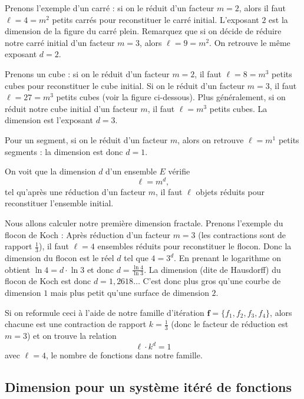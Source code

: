 \documentclass[11pt,class=report,crop=false]{standalone}
\begin{document}
Prenons l'exemple d'un carré : si on le réduit d'un facteur $m=2$,
alors il faut $\ell=4=m^2$ petits carrés pour reconstituer le carré initial.
L'exposant $2$ est la dimension de la figure du carré plein. Remarquez que si
on décide de réduire notre carré initial d'un facteur $m=3$,
alors $\ell=9=m^2$. On retrouve le même exposant $d=2$.


Prenons un cube : si on le réduit d'un facteur $m=2$, il faut 
$\ell=8=m^3$ petits cubes pour reconstituer le cube initial.
Si on le réduit d'un facteur $m=3$, il faut 
$\ell=27=m^3$ petits cubes (voir la figure ci-dessous).
Plus généralement, si on réduit notre cube initial d'un facteur $m$, il faut
$\ell=m^3$ petits cubes. La dimension est l'exposant $d=3$.


Pour un segment, si on le réduit d'un facteur $m$, alors on retrouve
$\ell=m^1$ petits segments : la dimension est donc $d=1$.

On voit que la dimension $d$ d'un ensemble $E$ vérifie 
$$\ell=m^d,$$
tel qu'après une réduction d'un facteur $m$, il faut $\ell$ objets 
réduits pour reconstituer l'ensemble initial. 

Nous allons calculer notre première dimension fractale.
Prenons l'exemple du flocon de Koch : 
Après réduction d'un facteur $m=3$ (les contractions sont de rapport $\frac 13$),
il faut $\ell = 4$ ensembles réduits pour reconstituer le flocon.
Donc la dimension du flocon est le réel $d$ tel que $4= 3^d$.
En prenant le logarithme on obtient $\ln 4 = d\cdot \ln 3$ et 
donc $d = \frac{\ln 4}{\ln 3}$.
La dimension (dite de Hausdorff) du flocon de Koch est donc $d=1,2618\ldots$
C'est donc \og plus gros \fg{} qu'une courbe de dimension $1$ mais \og plus petit \fg{} 
qu'une surface de dimension $2$.

Si on reformule ceci à l'aide de notre famille d'itération $\mathbf{f}=\{f_1,f_2,f_3,f_4\}$,
alors chacune est une contraction de rapport $k=\frac 13$ (donc le facteur de réduction est $m=3$)
et on trouve la relation 
$$\ell \cdot k^d = 1$$
avec $\ell=4$, le nombre de fonctions dans notre famille. 





\subsection{Dimension pour un système itéré de fonctions}
\end{document}

